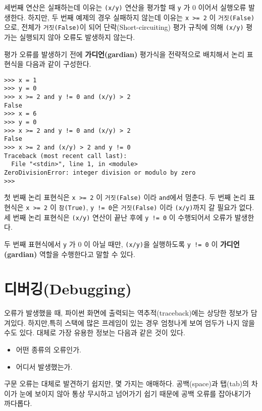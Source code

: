 세번째 연산은 실패하는데 이유는 {\tt (x/y)} 연산을 평가할 때 {\tt y} 가 0 이어서 실행오류 발생한다.
하지만, 두 번째 예제의 경우 실패하지 않는데 이유는 {\tt x >= 2} 이 {\tt 거짓(False)} 으로, 
전체가 {\tt 거짓(False)}이 되어 단락(Short-circuiting) 평가 규칙에 의해 {\tt (x/y)} 평가는 실행되지 않아 오류도 발생하지 않는다.

평가 오류를 발생하기 전에 {\bf 가디언(gardian)} 평가식을 전략적으로 배치해서 논리 표현식을 다음과 같이 구성한다. 

\beforeverb
\begin{verbatim}
>>> x = 1
>>> y = 0
>>> x >= 2 and y != 0 and (x/y) > 2
False
>>> x = 6 
>>> y = 0
>>> x >= 2 and y != 0 and (x/y) > 2
False
>>> x >= 2 and (x/y) > 2 and y != 0
Traceback (most recent call last):
  File "<stdin>", line 1, in <module>
ZeroDivisionError: integer division or modulo by zero
>>>
\end{verbatim}
\afterverb
%
첫 번째 논리 표현식은 {\tt x >= 2} 이 {\tt 거짓(False)} 이라 {\tt and}에서 멈춘다.
두 번째 논리 표현식은 {\tt x >= 2} 이 {\tt 참(True)}, {\tt y != 0}은 {\tt 거짓(False)} 이라 {\tt (x/y)}까지 갈 필요가 없다.
세 번째 논리 표현식은 {\tt (x/y)} 연산이 끝난 후에 {\tt y != 0} 이 수행되어서 오류가 발생한다.

두 번째 표현식에서 {\tt y} 가 0 이 아닐 때만, {\tt (x/y)}을 실행하도록 {\tt y != 0} 이 {\bf 가디언(gardian)} 역할을 수행한다고 말할 수 있다.

\section{디버깅(Debugging)}

오류가 발생했을 때, 파이썬 화면에 출력되는 역추적(traceback)에는 상당한 정보가 담겨있다. 
하지만,특히 스택에 많은 프레임이 있는 경우 엄청나게 보여 엄두가 나지 않을 수도 있다.
대체로 가장 유용한 정보는 다음과 같은 것이 있다.

\begin{itemize}

\item 어떤 종류의 오류인가.

\item 어디서 발생했는가.

\end{itemize}

구문 오류는 대체로 발견하기 쉽지만, 몇 가지는 애매하다. 공백(space)과 탭(tab)의 차이가 눈에 보이지 않아 
통상 무시하고 넘어가기 쉽기 때문에 공백 오류를 잡아내기가 까다롭다.

